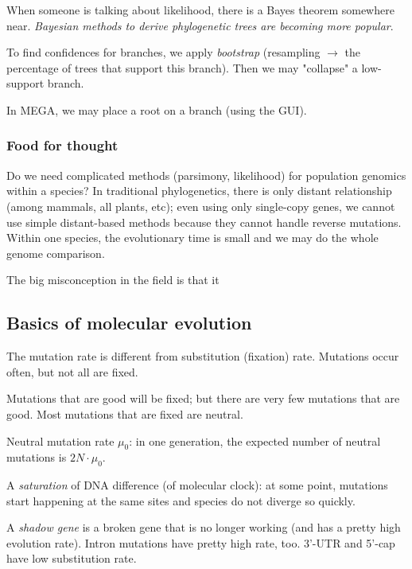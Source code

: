 \documentclass[main.tex]{subfiles}
\begin{document}
When someone is talking about likelihood, there is a Bayes theorem somewhere near.
\emph{Bayesian methods to derive phylogenetic trees are becoming more popular}.

To find confidences for branches, we apply \emph{bootstrap} (resampling $ \rightarrow $ the percentage of trees that support this branch).
Then we may "collapse" a low-support branch.

In MEGA, we may place a root on a branch (using the GUI).

\subsubsection{Food for thought}

Do we need complicated methods (parsimony, likelihood) for population genomics within a species?
In traditional phylogenetics, there is only distant relationship (among mammals, all plants, etc); even using only single-copy genes, we cannot use simple distant-based methods because they cannot handle reverse mutations.
Within one species, the evolutionary time is small and we may do the whole genome comparison.

The big misconception in the field is that it 

\subsection{Basics of molecular evolution}


The mutation rate is different from substitution (fixation) rate.
Mutations occur often, but not all are fixed.

Mutations that are good will be fixed; but there are very few mutations that are good.
Most mutations that are fixed are neutral.

Neutral mutation rate $ \mu_0 $: in one generation, the expected number of neutral mutations is $ 2 N \cdot \mu_0 $.


A \emph{saturation} of DNA difference (of molecular clock): at some point, mutations start happening at the same sites and species do not diverge so quickly.

A \emph{shadow gene} is a broken gene that is no longer working (and has a pretty high evolution rate).
Intron mutations have pretty high rate, too.
3'-UTR and 5'-cap have low substitution rate.
\end{document}
